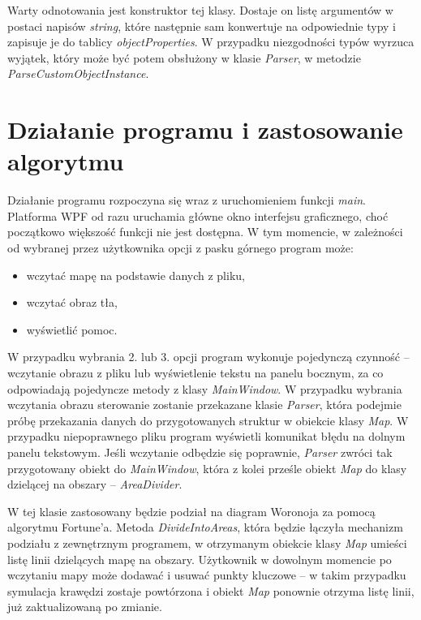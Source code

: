 \documentclass[a4paper,11pt]{article}
\newcommand\tab[1][0.6cm]{\hspace*{#1}}
\begin{document}
Warty odnotowania jest konstruktor tej klasy. Dostaje on listę argumentów w postaci napisów \textit{string}, które następnie sam konwertuje na odpowiednie typy i zapisuje je do tablicy \textit{objectProperties}. W przypadku niezgodności typów wyrzuca wyjątek, który może być potem obsłużony w klasie \textit{Parser}, w metodzie \textit{ParseCustomObjectInstance}.

\newpage

\section{Działanie programu i zastosowanie algorytmu}

\tab Działanie programu rozpoczyna się wraz z uruchomieniem funkcji \textit{main}. Platforma WPF od razu uruchamia główne okno interfejsu graficznego, choć początkowo większość funkcji nie jest dostępna. W tym momencie, w zależności od wybranej przez użytkownika opcji z pasku górnego program może:

\begin{itemize}
\item wczytać mapę na podstawie danych z pliku,
\item wczytać obraz tła,
\item wyświetlić pomoc.
\end{itemize}

W przypadku wybrania 2. lub 3. opcji program wykonuje pojedynczą czynność -- wczytanie obrazu z pliku lub wyświetlenie tekstu na panelu bocznym, za co odpowiadają pojedyncze metody z klasy \textit{MainWindow}. W przypadku wybrania wczytania obrazu sterowanie zostanie przekazane klasie \textit{Parser}, która podejmie próbę przekazania danych do przygotowanych struktur w obiekcie klasy \textit{Map}. W przypadku niepoprawnego pliku program wyświetli komunikat błędu na dolnym panelu tekstowym. Jeśli wczytanie odbędzie się poprawnie, \textit{Parser} zwróci tak przygotowany obiekt do \textit{MainWindow}, która z kolei prześle obiekt \textit{Map} do klasy dzielącej na obszary -- \textit{AreaDivider}.

W tej klasie zastosowany będzie podział na diagram Woronoja za pomocą algorytmu Fortune'a. Metoda \textit{DivideIntoAreas}, która będzie łączyła mechanizm podziału z zewnętrznym programem, w otrzymanym obiekcie klasy \textit{Map} umieści listę linii dzielących mapę na obszary. Użytkownik w dowolnym momencie po wczytaniu mapy może dodawać i usuwać punkty kluczowe -- w takim przypadku symulacja krawędzi zostaje powtórzona i obiekt \textit{Map} ponownie otrzyma listę linii, już zaktualizowaną po zmianie.
\end{document}
